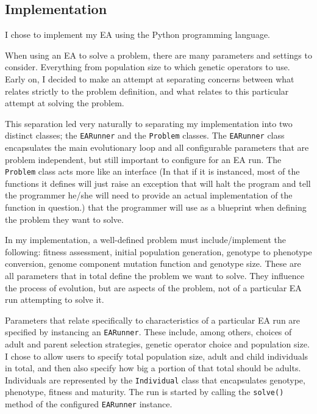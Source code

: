 \documentclass[twoside]{article}
\begin{document}
\begin{multicols}{2} %

    \section{Implementation}

    I chose to implement my EA using the Python programming language.

    When using an EA to solve a problem, there are many parameters and settings to consider.
    Everything from population size to which genetic operators to use.
    Early on, I decided to make an attempt at separating concerns between what relates strictly to the problem definition, and what relates to this particular attempt at solving the problem.

    This separation led very naturally to separating my implementation into two distinct classes; the \texttt{EARunner} and the \texttt{Problem} classes.
    The \texttt{EARunner} class encapsulates the main evolutionary loop and all configurable parameters that are problem independent, but still important to configure for an EA run.
    The \texttt{Problem} class acts more like an interface (In that if it is instanced, most of the functions it defines will just raise an exception that will halt the program and tell the programmer he/she will need to provide an actual implementation of the function in question.) that the programmer will use as a blueprint when defining the problem they want to solve.
    
    In my implementation, a well-defined problem must include/implement the following:
    fitness assessment, initial population generation, genotype to phenotype conversion, genome component mutation function and genotype size.
    These are all parameters that in total define the problem we want to solve.
    They influence the process of evolution, but are aspects of the problem, not of a particular EA run attempting to solve it.

    Parameters that relate specifically to characteristics of a particular EA run are specified by instancing an \texttt{EARunner}.
    These include, among others, choices of adult and parent selection strategies, genetic operator choice and population size.
    I chose to allow users to specify total population size, adult and child individuals in total, and then also specify how big a portion of that total should be adults.
    Individuals are represented by the \texttt{Individual} class that encapsulates genotype, phenotype, fitness and maturity.
    The run is started by calling the \texttt{solve()} method of the configured \texttt{EARunner} instance.


\end{multicols}
\end{document}
